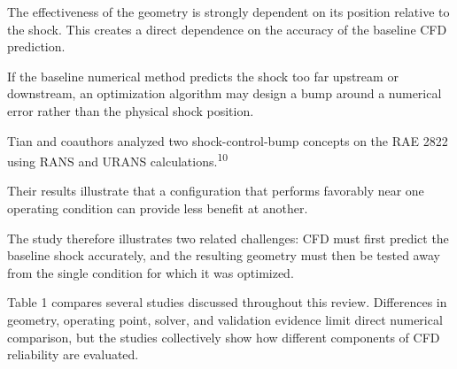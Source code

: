 \documentclass[10pt]{article}
\newcommand{\supercite}[1]{\textsuperscript{#1}}
\begin{document}
The effectiveness of the geometry is strongly dependent on its position
relative to the shock. This creates a direct dependence on the accuracy
of the baseline CFD prediction.

If the baseline numerical method predicts the shock too far upstream or
downstream, an optimization algorithm may design a bump around a
numerical error rather than the physical shock position.

Tian and coauthors analyzed two shock-control-bump concepts on the
RAE 2822 using RANS and URANS calculations.\supercite{10}

Their results illustrate that a configuration that performs favorably
near one operating condition can provide less benefit at another.

The study therefore illustrates two related challenges: CFD must first
predict the baseline shock accurately, and the resulting geometry must
then be tested away from the single condition for which it was
optimized.


Table 1 compares several studies discussed throughout this review.
Differences in geometry, operating point, solver, and validation
evidence limit direct numerical comparison, but the studies collectively
show how different components of CFD reliability are evaluated.
\end{document}
